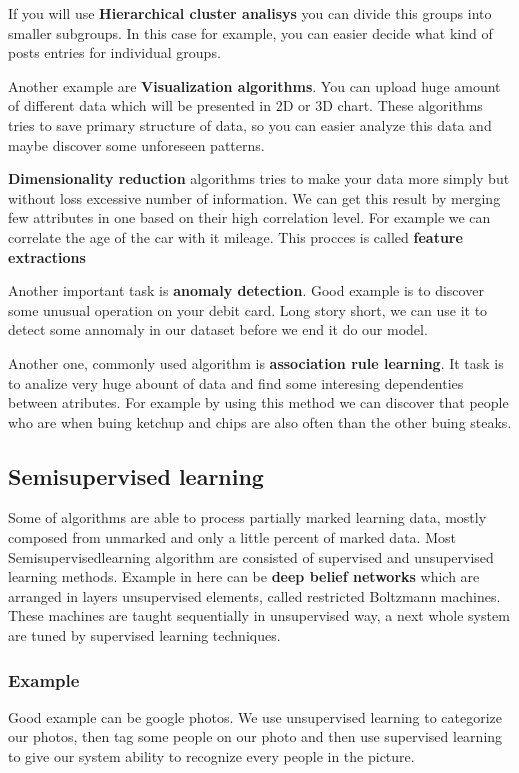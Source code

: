 \documentclass{article}
\begin{document}
    If you will use \textbf{Hierarchical cluster analisys} you can divide this groups into smaller subgroups. In this case for example, you can easier decide what kind of posts entries for individual groups.

    Another example are \textbf{Visualization algorithms}. You can upload huge amount of different data which will be presented in 2D or 3D chart. These algorithms tries to save primary structure of data, so you can easier analyze this data and maybe discover some unforeseen patterns.

    \textbf{Dimensionality reduction} algorithms tries to make your data more simply but without loss excessive number of information. We can get this result by merging few attributes in one based on their high correlation level. For example we can correlate the age of the car with it mileage. This procces is called \textbf{feature extractions}

    Another important task is \textbf{anomaly detection}. Good example is to discover some unusual operation on your debit card. Long story short, we can use it to detect some annomaly in our dataset before we end it do our model.

    Another one, commonly used algorithm is \textbf{association rule learning}. It task is to analize very huge abount of data and find some interesing dependenties between atributes. For example by using this method we can discover that people who are when buing ketchup and chips are also often than the other buing steaks.
  \newpage

  \subsection{Semisupervised learning}
  Some of algorithms are able to process partially marked learning data,  mostly composed from unmarked and only a little percent of marked data. Most Semisupervisedlearning algorithm are consisted of supervised and unsupervised learning methods. Example in here can be \textbf{deep belief networks} which are arranged in layers unsupervised elements, called restricted Boltzmann machines. These machines are taught sequentially in unsupervised way, a next whole system are tuned by supervised learning techniques.
  
    \subsubsection{Example}
    Good example can be google photos. We use unsupervised learning to categorize our photos, then tag some people on our photo and then use supervised learning to give our system ability to recognize every people in the picture.
  
\end{document}
